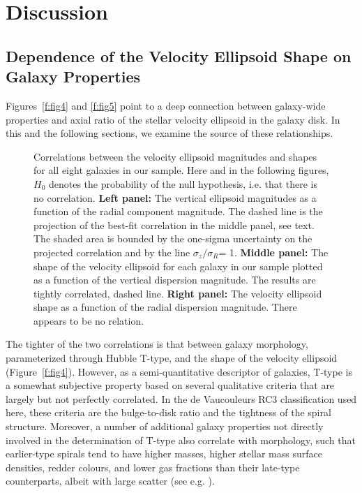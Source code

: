 \documentclass[useAMS,usenatbib]{mn2e}
\newcommand{\szsr}{$\sigma_z/\sigma_R$}
\begin{document}
\section{Discussion}
\label{sec:discussion}


\subsection{Dependence of the Velocity Ellipsoid Shape on Galaxy Properties}
\label{sec:interpretation}

Figures~\ref{f:fig4} and \ref{f:fig5} point to a deep connection between
galaxy-wide properties and axial ratio of the stellar velocity ellipsoid
in the galaxy disk.  In this and the following sections, we examine the
source of these relationships.

\begin{figure}
    \centerline{}
   \caption{Correlations between the velocity ellipsoid magnitudes and
     shapes for all eight galaxies in our sample.  Here and in
     the following figures, $H_0$ denotes the probability of the null
     hypothesis, i.e. that there is no correlation.  {\bf Left panel:}
     The vertical ellipsoid magnitudes as a function of the radial
     component magnitude.  The dashed line is the projection of the
     best-fit correlation in the middle panel, see text.  The shaded
     area is bounded by the one-sigma uncertainty on the projected
     correlation and by the line \szsr = 1.  {\bf Middle panel:} The
     shape of the velocity ellipsoid for each galaxy in our sample
     plotted as a function of the vertical dispersion magnitude.  The
     results are tightly correlated, dashed line. {\bf Right panel:} The
     velocity ellipsoid shape as a function of the radial dispersion
     magnitude.  There appears to be no relation.
   \label{f:fig6}}
\end{figure}

The tighter of the two correlations is that between galaxy morphology,
parameterized through Hubble T-type, and the shape of the velocity
ellipsoid (Figure~\ref{f:fig4}).  However, as a semi-quantitative
descriptor of galaxies, T-type is a somewhat subjective property based
on several qualitative criteria that are largely but not perfectly
correlated.  In the de Vaucouleurs RC3 classification used here, these
criteria are the bulge-to-disk ratio and the tightness of the spiral
structure.
%
Moreover, a number of additional galaxy properties not directly involved
in the determination of T-type also correlate with morphology, such that
earlier-type spirals tend to have higher masses, higher stellar mass
surface densities, redder colours, and lower gas fractions than their
late-type counterparts, albeit with large scatter (see
e.g. \citealt{Roberts1994}).
\end{document}
